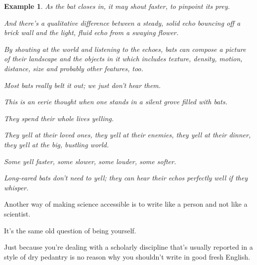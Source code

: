 \documentclass{book}
\numberwithin{equation}{section}
\newtheorem{example}{Example}[chapter]
\begin{document}
\begin{example}
    As the bat closes in, it may shout faster, to pinpoint its prey.
    
    And there's a qualitative difference between a steady, solid echo bouncing off a brick wall and the light, fluid echo from a swaying flower.
    
    By shouting at the world and listening to the echoes, bats can compose a picture of their landscape and the objects in it which includes texture, density, motion, distance, size and probably other features, too.
    
    Most bats really belt it out; we just don't hear them.
    
    This is an eerie thought when one stands in a silent grove filled with bats.
    
    They spend their whole lives yelling.
    
    They yell at their loved ones, they yell at their enemies, they yell at their dinner, they yell at the big, bustling world.
    
    Some yell faster, some slower, some louder, some softer.
    
    Long-eared bats don't need to yell; they can hear their echos perfectly well if they whisper.
\end{example}
Another way of making science accessible is to write like a person and not like a scientist.

It's the same old question of being yourself.

Just because you're dealing with a scholarly discipline that's usually reported in a style of dry pedantry is no reason why you shouldn't write in good fresh English.
\end{document}
